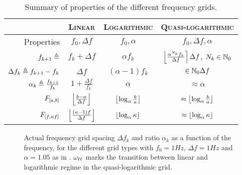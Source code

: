   \begin{table}
  \centering
   \caption{Summary of  properties of the different frequency grids.}
   \label{tbl:excitation:gridProperties}
    \begin{tabular}{rccc} 
    \toprule
     & \textsc{Linear} & \textsc{Logarithmic} & \textsc{Quasi-logarithmic} \\
    \midrule
    Properties 
       & $f_0, \Delta f$ 
       & $f_0, \alpha$ 
       & $f_0, \Delta f, \alpha$\\
    \midrule
    $f_{k+1} \triangleq$ 
       & $f_{k} + \Delta f$ 
       & $\alpha f_{k}$
       & $\left\lfloor \frac{\alpha^{N_k} f_k}{\Delta f} \right\rceil \Delta f$,   $N_k \in \mathbb{N}_{0}$
       \\[5pt]
    $\Delta f_k \triangleq f_{k+1} - f_k$ 
       & $\Delta f$
       & $(\alpha - 1) f_k$
       & $ \in \mathbb{N}_{0} \Delta f$ \\[5pt]
    $\alpha_k \triangleq \frac{f_{k+1}}{f_k}$ 
       & $1 + \frac{\Delta f}{f_k}$ 
       & $\alpha$ 
       & $\approx \alpha $ \\[5pt]
    $F_{\left[ a,b \right]}$
       & $\left\lfloor \frac{b - a}{\Delta f} \right\rfloor$
       & $\left\lfloor \log_{\alpha} \frac{b}{a} \right\rfloor$
       & $\approx \left\lfloor \log_{\alpha} \frac{b}{a} \right\rfloor$\\[5pt]
    $F_{\left[ f, \kappa f \right]}$
      & $\left\lfloor \frac{(\kappa - 1)f}{\Delta f} \right\rfloor$
      & $\left\lfloor \log_{\alpha} \kappa \right\rfloor$
      & $\approx \left\lfloor \log_{\alpha} \kappa \right\rfloor$\\[5pt]
    \bottomrule
    \end{tabular}
  \end{table}

  \begin{figure}
    \centering
    \setlength{}
    \setlength\figureheight{0.68\figurewidth}
    
    \caption[Actual frequency grid spacing and ratio for different grids]{Actual frequency grid spacing $\Delta f_k$ and ratio $\alpha_k$ as a function of the frequency, for the different grid types with $f_0 =1\unit{Hz}$, $\Delta f = 1\unit{Hz}$ and $\alpha =1.05$ as in . $\omega_{\ell \ell}$ marks the transition between linear and logarithmic regime in the quasi-logarithmic grid.}
    \label{fig:excitation:gridPropertyPlots}
  \end{figure}

